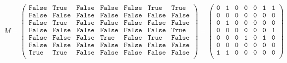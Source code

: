 \begin{exemple}  

\footnotesize{
$M =
\begin{pmatrix}
\texttt{False} & \texttt{True} & \texttt{False} & \texttt{False} & \texttt{False} & \texttt{True} & \texttt{True} \\
\texttt{False} & \texttt{False} & \texttt{False} & \texttt{False} & \texttt{False} & \texttt{False} & \texttt{False} \\ 
\texttt{False} & \texttt{True} & \texttt{False} & \texttt{False} & \texttt{False} & \texttt{False} & \texttt{False} \\
\texttt{False} & \texttt{False} & \texttt{False} & \texttt{False} & \texttt{False} & \texttt{False} & \texttt{True} \\
\texttt{False} & \texttt{False} & \texttt{False} & \texttt{True} & \texttt{False} & \texttt{True} & \texttt{False} \\
\texttt{False} & \texttt{False} & \texttt{False} & \texttt{False} & \texttt{False} & \texttt{False} & \texttt{False} \\
\texttt{True} & \texttt{True} & \texttt{False} & \texttt{False} & \texttt{False} & \texttt{False} & \texttt{False} \\
\end{pmatrix}
=
\begin{pmatrix}
\texttt{0} & \texttt{1} & \texttt{0} & \texttt{0} & \texttt{0} & \texttt{1} & \texttt{1} \\
\texttt{0} & \texttt{0} & \texttt{0} & \texttt{0} & \texttt{0} & \texttt{0} & \texttt{0} \\ 
\texttt{0} & \texttt{1} & \texttt{0} & \texttt{0} & \texttt{0} & \texttt{0} & \texttt{0} \\
\texttt{0} & \texttt{0} & \texttt{0} & \texttt{0} & \texttt{0} & \texttt{0} & \texttt{1} \\
\texttt{0} & \texttt{0} & \texttt{0} & \texttt{1} & \texttt{0} & \texttt{1} & \texttt{0} \\
\texttt{0} & \texttt{0} & \texttt{0} & \texttt{0} & \texttt{0} & \texttt{0} & \texttt{0} \\
\texttt{1} & \texttt{1} & \texttt{0} & \texttt{0} & \texttt{0} & \texttt{0} & \texttt{0} \\
\end{pmatrix}$}

\end{exemple}







